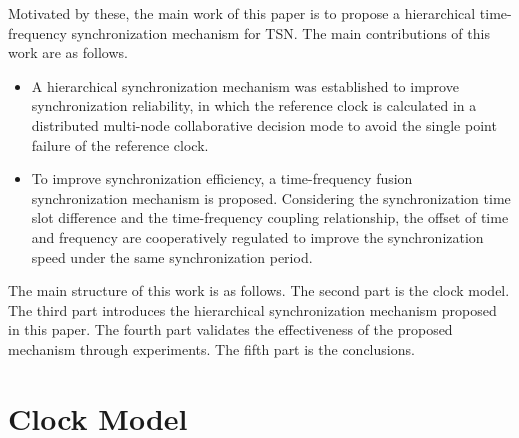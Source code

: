 \documentclass[conference]{IEEEtran}
\begin{document}

Motivated by these, the main work of this paper is to propose a hierarchical time-frequency synchronization mechanism for TSN. The main contributions of this work are as follows.

\begin{itemize}
	
	\item A hierarchical synchronization mechanism was established to improve synchronization reliability, in which the reference clock is calculated in a distributed multi-node collaborative decision mode to avoid the single point failure of the reference clock.
	\item To improve synchronization efficiency, a time-frequency fusion synchronization mechanism is proposed. Considering the synchronization time slot difference and the time-frequency coupling relationship, the offset of time and frequency are cooperatively regulated to improve the synchronization speed under the same synchronization period.
	
\end{itemize}
 
The main structure of this work is as follows. The second part is the clock model. The third part introduces the hierarchical synchronization mechanism proposed in this paper. The fourth part validates the effectiveness of the proposed mechanism through experiments. The fifth part is the conclusions. 

\section{Clock Model}
\end{document}

